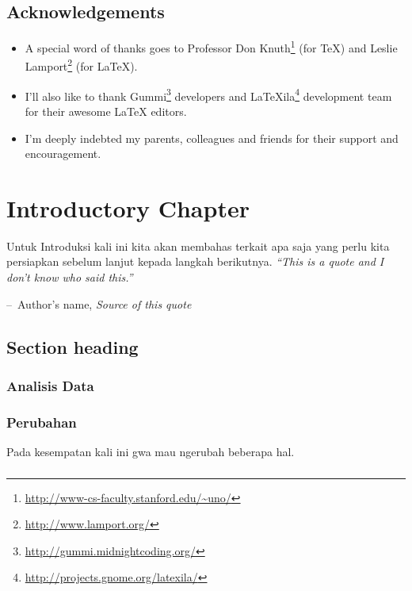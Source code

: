 \documentclass[a4paper,11pt]{book}
\makeatletter
\newenvironment{chapquote}[2][2em]
  {\setlength{\@tempdima}{#1}%
   \def\chapquote@author{#2}%
   \parshape 1 \@tempdima \dimexpr\textwidth-2\@tempdima\relax%
   \itshape}
  {\par\normalfont\hfill--\ \chapquote@author\hspace*{\@tempdima}\par\bigskip}
\makeatother
\begin{document}
\section*{Acknowledgements}
\begin{itemize}
\item A special word of thanks goes to Professor Don Knuth\footnote{\url{http://www-cs-faculty.stanford.edu/~uno/}} (for \TeX{}) and Leslie Lamport\footnote{\url{http://www.lamport.org/}} (for \LaTeX{}).
\item I'll also like to thank Gummi\footnote{\url{http://gummi.midnightcoding.org/}} developers and LaTeXila\footnote{\url{http://projects.gnome.org/latexila/}} development team for their awesome \LaTeX{} editors.
\item I'm deeply indebted my parents, colleagues and friends for their support and encouragement.
\end{itemize}

\chapter{Introductory Chapter}
Untuk Introduksi kali ini kita akan membahas terkait apa saja yang perlu kita persiapkan sebelum lanjut kepada langkah berikutnya.
\begin{chapquote}{Author's name, \textit{Source of this quote}}
``This is a quote and I don't know who said this.''
\end{chapquote}

\section{Section heading}


\subsection{Analisis Data}

\subsection{Perubahan}
Pada kesempatan kali ini gwa mau ngerubah beberapa hal.

\subsection{}


\subsection{}
\end{document}
